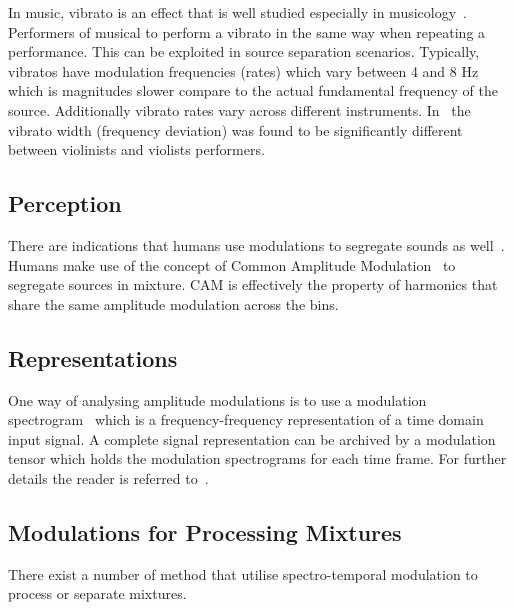 In music, vibrato is an effect that is well studied especially in musicology~\cite{A, B, C, D, E}.
Performers of musical to perform a vibrato in the same way when repeating a performance. This can be exploited in
source separation scenarios.
Typically, vibratos have modulation frequencies (rates) which vary between 4 and 8 Hz which is magnitudes slower compare to the actual fundamental frequency of the source.
Additionally vibrato rates vary across different instruments.
In~\cite{macleod2006} the vibrato width (frequency deviation) was found to be significantly different between violinists and violists performers.\\

\subsection{Perception}
There are indications that humans use modulations to segregate sounds as well~\cite{dau99}.
Humans make use of the concept of Common Amplitude Modulation~\cite{bregman90} to segregate sources in mixture.
CAM is effectively the property of harmonics that share the
same amplitude modulation across the bins.

\subsection{Representations}
One way of analysing amplitude modulations is to use a modulation spectrogram~\cite{greenberg97} which is a frequency-frequency
representation of a time domain input signal.
A complete signal representation can be archived by a modulation tensor which holds the modulation spectrograms for each time frame.
For further details the reader is referred to~\cite{barker15}.

\subsection{Modulations for Processing Mixtures}
There exist a number of method that utilise spectro-temporal modulation to process or separate mixtures.

